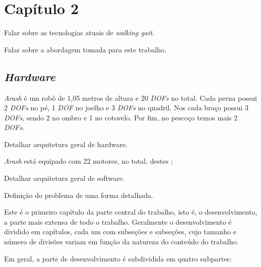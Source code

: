 
\chapter{Capítulo 2}

\begin{guide}
	Falar sobre as tecnologias atuais de \textit{walking gait}.
\end{guide}

\begin{guide}
	Falar sobre a abordagem tomada para este trabalho.
\end{guide}

\section{\textit{Hardware}}

\textit{Arash} é um robô de 1,05 metros de altura e 20 \textit{DOFs} no total. Cada perna possui 2 \textit{DOFs} no pé, 1 \textit{DOF} no joelho e 3 \textit{DOFs} no quadril. Nos cada braço possui 3 \textit{DOFs}, sendo 2 no ombro e 1 no cotovelo. Por fim, no pescoço temos mais 2 \textit{DOFs}.

\begin{guide}
	Detalhar arquitetura geral de hardware.
\end{guide}

\textit{Arash} está equipado com 22 motores, no total, destes ;

\begin{guide}
	Detalhar arquitetura geral de software.
\end{guide}

\begin{guide}
	Definição do problema de uma forma detalhada.
\end{guide}


Este é o primeiro capítulo da parte central do trabalho, isto é, o
desenvolvimento, a parte mais extensa de todo o trabalho. Geralmente o
desenvolvimento é dividido em capítulos, cada um com subseções e subseções,
cujo tamanho e número de divisões variam em função da natureza do conteúdo do
trabalho.

Em geral, a parte de desenvolvimento é subdividida em quatro subpartes:

